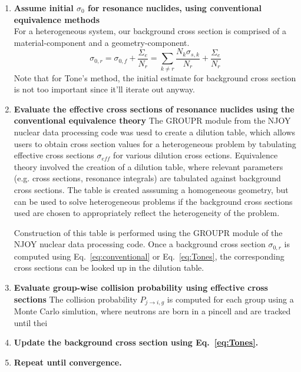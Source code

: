 \documentclass[10pt]{article}
\begin{document}
      \begin{enumerate}
        \item \textbf{Assume initial $\sigma_0$ for resonance nuclides, using conventional equivalence methods}\\
  For a heterogeneous system, our background cross section is comprised of a material-component and a geometry-component.
\begin{equation}\sigma_{0,r}=\sigma_{0,f}+\frac{\Sigma_e}{N_r}=\sum_{k\neq r}\frac{N_k\sigma_{s,k}}{N_r}+\frac{\Sigma_e}{N_r}\label{eq:conventional}\end{equation}
Note that for Tone's method, the initial estimate for background cross section is not too important since it'll iterate out anyway.

        \item \textbf{Evaluate the effective cross sections of resonance nuclides using the conventional equivalence theory}
          The GROUPR module from the NJOY nuclear data processing code was uesd to create a dilution table, which allows users to obtain cross section values for a heterogeneous problem by tabulating effective cross sections $\sigma_{eff}$ for various dilution cross ections. 
           Equivalence theory involved the creation of a dilution table, where relevant parameters (e.g. cross sections, resonance integrals) are tabulated against background cross sections. The table is created asssuming a homogeneous geometry, but can be used to solve heterogeneous problems if the background cross sections used are chosen to appropriately reflect the heterogeneity of the problem. \par
           Construction of this table is performed using the GROUPR module of the NJOY nuclear data processing code. Once a background cross section $\sigma_{0,r}$ is computed using Eq.~\ref{eq:conventional} or Eq.~\ref{eq:Tones}, the corresponding cross sections can be looked up in the dilution table.
         \item \textbf{Evaluate group-wise collision probability using effective cross sections}
           The collision probability $P_{j\rightarrow i,g}$ is computed for each group using a Monte Carlo simlution, where neutrons are born in a pincell and are tracked until thei
         \item \textbf{Update the background cross section using Eq.~\ref{eq:Tones}.}

         \item \textbf{Repeat until convergence.}
      \end{enumerate}
\end{document}
